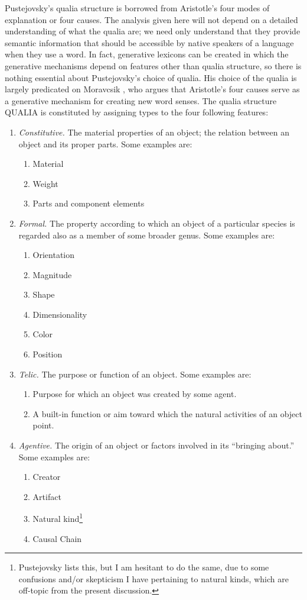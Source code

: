 Pustejovsky's qualia structure is borrowed from Aristotle's four modes of explanation or four causes. The analysis given here will not depend on a detailed understanding of what the qualia are; we need only understand that they provide semantic information that should be accessible by native speakers of a language when they use a word.  In fact, generative lexicons can be created in which the generative mechanisms depend on features other than qualia structure, so there is nothing essential about Pustejovsky's choice of qualia. His choice of the qualia is largely predicated on Moravcsik \cite{moravcsik_aitia_1975}, who argues that Aristotle's four causes serve as a generative mechanism for creating new word senses.  The qualia structure QUALIA is constituted by assigning types to the four following features:
\begin{enumerate}
\item \emph{Constitutive.} The material properties of an object; the relation between an object and its  proper parts. Some examples are:
	\begin{enumerate}
	\item Material
	\item Weight
	\item Parts and component elements
	\end{enumerate}
\item \emph{Formal.} The property according to which an object of a particular species is regarded also as a member of some broader genus. Some examples are:
	\begin{enumerate}
	\item Orientation
	\item Magnitude
	\item Shape
	\item Dimensionality
	\item Color
	\item Position
	\end{enumerate}
\item \emph{Telic.} The purpose or function of an object. Some examples are:
	\begin{enumerate}
	\item Purpose for which an object was created by some agent.
	\item A built-in function or aim toward which the natural activities of an object point.
	\end{enumerate}
\item \emph{Agentive.} The origin of an object or factors involved in its ``bringing about.'' Some examples are:
	\begin{enumerate}
	\item Creator
	\item Artifact
	\item Natural kind\footnote{Pustejovsky lists this, but I am hesitant to do the same, due to some confusions and/or skepticism I have pertaining to natural kinds, which are off-topic from the present discussion.}
	\item Causal Chain
	\end{enumerate}
\end{enumerate}

